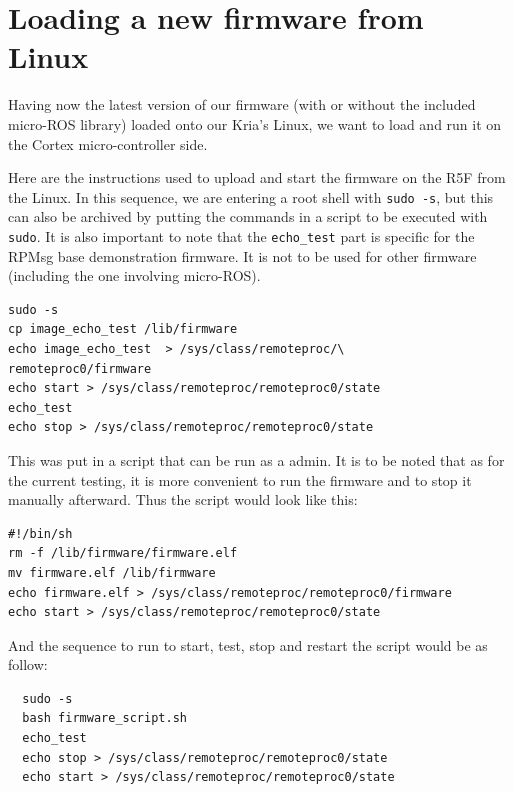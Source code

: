 \documentclass[10pt]{article}
\begin{document}
\section{Loading a new firmware from Linux}
Having now the latest version of our firmware (with or without the included
micro-ROS library) loaded onto our Kria's Linux, we want to load and run it
on the Cortex micro-controller side.

Here are the instructions used to upload and start the firmware
on the R5F from the Linux.
In this sequence, we are entering a root shell with \verb|sudo -s|, but this can
also be archived by putting the commands in a script to be executed with \verb|sudo|.
It is also important to note that the \verb|echo_test| part is specific for the
RPMsg base demonstration firmware. It is not to be used for other firmware
(including the one involving micro-ROS).
\begin{tcolorbox}
\begin{verbatim}
sudo -s
cp image_echo_test /lib/firmware
echo image_echo_test  > /sys/class/remoteproc/\
remoteproc0/firmware
echo start > /sys/class/remoteproc/remoteproc0/state
echo_test
echo stop > /sys/class/remoteproc/remoteproc0/state
\end{verbatim}
\end{tcolorbox}

This was put in a script that can be run as a admin.
It is to be noted that as for the current testing, it is more convenient
to run the firmware and to stop it manually afterward.
Thus the script would look like this:
\begin{tcolorbox}
\begin{verbatim}
#!/bin/sh
rm -f /lib/firmware/firmware.elf
mv firmware.elf /lib/firmware
echo firmware.elf > /sys/class/remoteproc/remoteproc0/firmware
echo start > /sys/class/remoteproc/remoteproc0/state
\end{verbatim}
\end{tcolorbox}

And the sequence to run to start, test, stop and restart the script would be
as follow:
\begin{tcolorbox}
\begin{verbatim}
  sudo -s
  bash firmware_script.sh
  echo_test
  echo stop > /sys/class/remoteproc/remoteproc0/state
  echo start > /sys/class/remoteproc/remoteproc0/state
\end{verbatim}
\end{tcolorbox}
\end{document}
